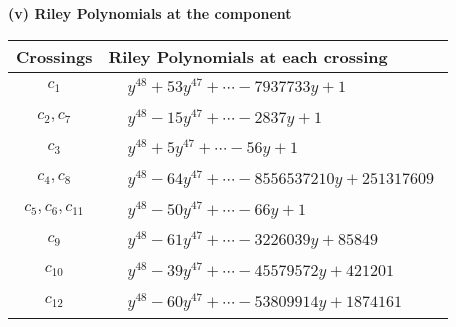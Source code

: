 \documentclass[1p]{elsarticle_modified}
\theoremstyle{definition}
\begin{document}
\newpage\renewcommand{\arraystretch}{1}
\flushleft \textbf{(v) Riley Polynomials at the component}\newline \\
\begin{tabular}{m{50pt}|m{274pt}}
Crossings & \hspace{64pt}Riley Polynomials at each crossing \\
\hline $$\begin{aligned}c_{1}\end{aligned}$$&$\begin{aligned}
&y^{48}+53 y^{47}+\cdots-7937733 y+1
\end{aligned}$\\
\hline $$\begin{aligned}c_{2},c_{7}\end{aligned}$$&$\begin{aligned}
&y^{48}-15 y^{47}+\cdots-2837 y+1
\end{aligned}$\\
\hline $$\begin{aligned}c_{3}\end{aligned}$$&$\begin{aligned}
&y^{48}+5 y^{47}+\cdots-56 y+1
\end{aligned}$\\
\hline $$\begin{aligned}c_{4},c_{8}\end{aligned}$$&$\begin{aligned}
&y^{48}-64 y^{47}+\cdots-8556537210 y+251317609
\end{aligned}$\\
\hline $$\begin{aligned}c_{5},c_{6},c_{11}\end{aligned}$$&$\begin{aligned}
&y^{48}-50 y^{47}+\cdots-66 y+1
\end{aligned}$\\
\hline $$\begin{aligned}c_{9}\end{aligned}$$&$\begin{aligned}
&y^{48}-61 y^{47}+\cdots-3226039 y+85849
\end{aligned}$\\
\hline $$\begin{aligned}c_{10}\end{aligned}$$&$\begin{aligned}
&y^{48}-39 y^{47}+\cdots-45579572 y+421201
\end{aligned}$\\
\hline $$\begin{aligned}c_{12}\end{aligned}$$&$\begin{aligned}
&y^{48}-60 y^{47}+\cdots-53809914 y+1874161
\end{aligned}$\\
\hline
\end{tabular}\\~\\
\end{document}
